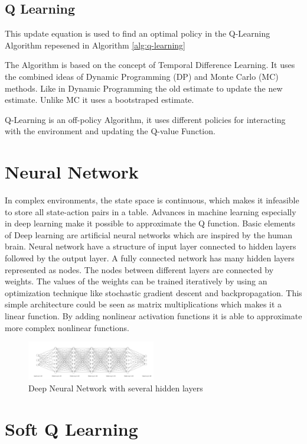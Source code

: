 \subsection{Q Learning}
This update equation is used to find an optimal policy in the Q-Learning Algorithm repesened in Algorithm \ref{alg:q-learning}

The Algorithm is based on the concept of Temporal Difference Learning.
It uses the combined ideas of Dynamic Programming (DP) and Monte Carlo (MC) methods.
Like in Dynamic Programming the old estimate to update the new estimate. Unlike MC it uses a bootstraped estimate.

Q-Learning is an off-policy Algorithm, it uses different policies for interacting with the environment and updating the Q-value Function.

\section{Neural Network}
In complex environments, the state space is continuous, which makes it infeasible to store all state-action pairs in a table.
Advances in machine learning especially in deep learning make it possible to approximate the Q function.  
Basic elements of Deep learning are artificial neural networks which are inspired by the human brain.
Neural network have a structure of input layer connected to hidden layers followed by the output layer. 
A fully connected network has many hidden layers represented as nodes. The nodes between different layers are connected by weights. 
The values of the weights can be trained iteratively by using an optimization technique like stochastic gradient descent and backpropagation.
This simple architecture could be seen as matrix multiplications which makes it a linear function.
By adding nonlinear activation functions it is able to approximate more complex nonlinear functions.
\begin{figure}[h]
  \centering
  \includegraphics[width=0.5\textwidth]{figures/background/nn.png}
  \caption{Deep Neural Network with several hidden layers}
  \label{fig:tab-training}
\end{figure}



\section{Soft Q Learning}

